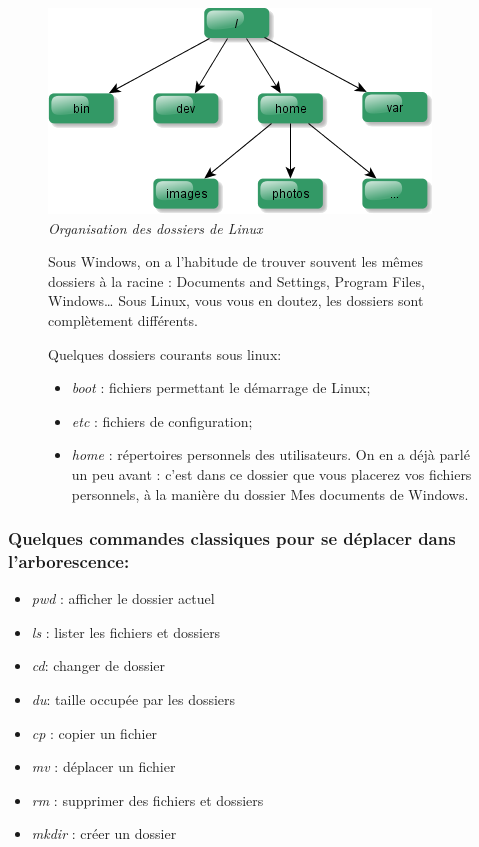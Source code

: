 \documentclass[11pt,oneside]{article}
\begin{document}
\begin{figure}[H]
\begin{minipage}[c]{.49\linewidth}
\begin{center}
\includegraphics[width=.9\textwidth]{images/archilin.png}
\textit{Organisation des dossiers de Linux}
\end{center}
\end{minipage} \hfill
\begin{minipage}[c]{.49\linewidth}

Sous Windows, on a l'habitude de trouver souvent les mêmes dossiers à la racine : Documents and Settings, Program Files, Windows… Sous Linux, vous vous en doutez, les dossiers sont complètement différents. 
\newline\newline

Quelques dossiers courants sous linux:
\begin{itemize}
\item \textit{boot} : fichiers permettant le démarrage de Linux;
\item \textit{etc} : fichiers de configuration;
\item \textit{home} : répertoires personnels des utilisateurs. On en a déjà parlé un peu avant : c'est dans ce dossier que vous placerez vos fichiers personnels, à la manière du dossier Mes documents de Windows.
\end{itemize}
\end{minipage}
\end{figure}


\subsubsection{Quelques commandes classiques pour se déplacer dans l'arborescence:}

\begin{itemize}
\item \textit{pwd} : afficher le dossier actuel
\item \textit{ls} : lister les fichiers et dossiers
\item \textit{cd}: changer de dossier
\item \textit{du}: taille occupée par les dossiers
\item \textit{cp} : copier un fichier
\item \textit{mv} : déplacer un fichier
\item \textit{rm} : supprimer des fichiers et dossiers
\item \textit{mkdir} : créer un dossier
\end{itemize}
\end{document}
